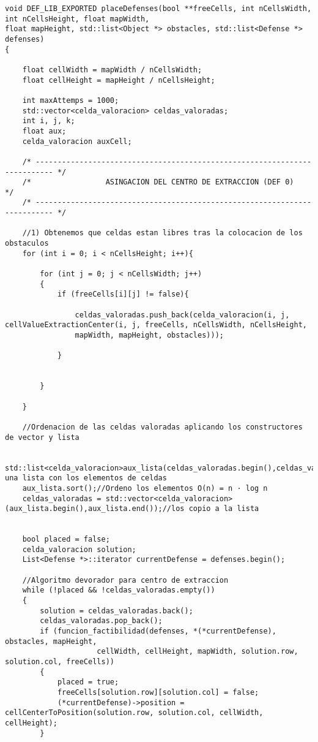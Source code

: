 \begin{lstlisting}
void DEF_LIB_EXPORTED placeDefenses(bool **freeCells, int nCellsWidth, int nCellsHeight, float mapWidth, 
float mapHeight, std::list<Object *> obstacles, std::list<Defense *> defenses)
{

    float cellWidth = mapWidth / nCellsWidth;
    float cellHeight = mapHeight / nCellsHeight;

    int maxAttemps = 1000;
    std::vector<celda_valoracion> celdas_valoradas;
    int i, j, k;
    float aux;
    celda_valoracion auxCell;

    /* -------------------------------------------------------------------------- */
    /*                 ASINGACION DEL CENTRO DE EXTRACCION (DEF 0)                */
    /* -------------------------------------------------------------------------- */

    //1) Obtenemos que celdas estan libres tras la colocacion de los obstaculos
    for (int i = 0; i < nCellsHeight; i++){
        
        for (int j = 0; j < nCellsWidth; j++)
        {
            if (freeCells[i][j] != false){
                
                celdas_valoradas.push_back(celda_valoracion(i, j, cellValueExtractionCenter(i, j, freeCells, nCellsWidth, nCellsHeight, 
                mapWidth, mapHeight, obstacles)));

            }
                
                
        }

    }
    
    //Ordenacion de las celdas valoradas aplicando los constructores de vector y lista 
    
    std::list<celda_valoracion>aux_lista(celdas_valoradas.begin(),celdas_valoradas.end());//Creo una lista con los elementos de celdas
    aux_lista.sort();//Ordeno los elementos O(n) = n · log n
    celdas_valoradas = std::vector<celda_valoracion>(aux_lista.begin(),aux_lista.end());//los copio a la lista


    bool placed = false;
    celda_valoracion solution;
    List<Defense *>::iterator currentDefense = defenses.begin();

    //Algoritmo devorador para centro de extraccion
    while (!placed && !celdas_valoradas.empty())
    {
        solution = celdas_valoradas.back();
        celdas_valoradas.pop_back();
        if (funcion_factibilidad(defenses, *(*currentDefense), obstacles, mapHeight,
                     cellWidth, cellHeight, mapWidth, solution.row, solution.col, freeCells))
        {
            placed = true;
            freeCells[solution.row][solution.col] = false;
            (*currentDefense)->position = cellCenterToPosition(solution.row, solution.col, cellWidth, cellHeight);
        }
        

\end{lstlisting}
